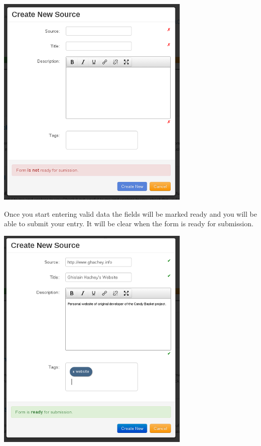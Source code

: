 \documentclass[letterpaper,10pt,english]{sphinxmanual}
\begin{document}
{\hfill\includegraphics{candy-basket-add-not-ready.png}\hfill}

Once you start entering valid data the fields will be marked ready and
you will be able to submit your entry. It will be clear when the form
is ready for submission.

{\hfill\includegraphics{candy-basket-add-ready.png}\hfill}
\end{document}
